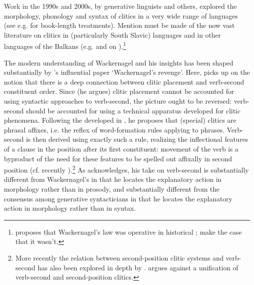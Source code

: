Work in the 1990s and 2000s, by generative linguists and others, explored the morphology, phonology and syntax of clitics in a very wide range of languages (see e.g. \citealp{HalpernZwicky1996,BeukemaDenDikken2000,FranksKing2000,GerlachGrijzenhout2000,Boskovic2001,Anderson2005,Roberts2010,SpencerLuis2012,SalvesenHelland2013} for book-length treatments). Mention must be made of the now vast literature on clitics in  (particularly South Slavic) languages \citep{RadanovicKocic1988,RadanovicKocic1996,NevisJoseph1993,Schuetze1994,DimitrovaVulchanova1995,DimitrovaVulchanova1998,Progovac1996,Progovac2000,Tomic1996,Tomic2000,Franks1997,Franks2000,Franks2008,FranksBoskovic2001,FranksKing2000,Boskovic2000,Boskovic2001,Boskovic2002,Boskovic2016,Pancheva2005,Migdalski2010,Migdalski2012,Migdalski2016,DiesingZec2011,Harizanov2014,Despic2017} and in other languages of the Balkans (e.g. \citealp{Francu2009} and \citealp{AlboiuHill2012} on ).\footnote{\citet{Francu2009} proposes that Wackernagel's law was operative in historical ; \citet{AlboiuHill2012} make the case that it wasn't.}

The modern understanding of Wackernagel and his insights has been shaped substantially by \citeauthor{Anderson1993}'s \citeyearpar{Anderson1993} influential paper `Wackernagel's revenge'. Here, \citeauthor{Anderson1993} picks up on the notion that there is a deep connection between clitic placement and verb-second constituent order. Since (he argues) clitic placement cannot be accounted for using syntactic approaches to verb-second, the picture ought to be reversed: verb-second should be accounted for using a technical apparatus developed for clitic phenomena. Following the  developed in \citet{Anderson1992}, he proposes that (special) clitics are phrasal affixes, i.e. the reflex of word-formation rules applying to phrases. Verb-second is then derived using exactly such a rule, realizing the inflectional features of a clause in the position after its first constituent: movement of the verb is a byproduct of the need for these features to be spelled out affixally in second position (cf. recently \citealp{BayerFreitag2020}).\footnote{More recently the relation between second-position clitic systems and verb-second has also been explored in depth by \citet{Migdalski2010,Migdalski2016}. \citet{Boskovic2020} argues against a unification of verb-second and second-position clitics.} As \citeauthor{Anderson1993} acknowledges, his take on verb-second is substantially different from Wackernagel's in that he locates the explanatory action in morphology rather than in prosody, and substantially different from the consensus among generative syntacticians in that he locates the explanatory action in morphology rather than in syntax.

